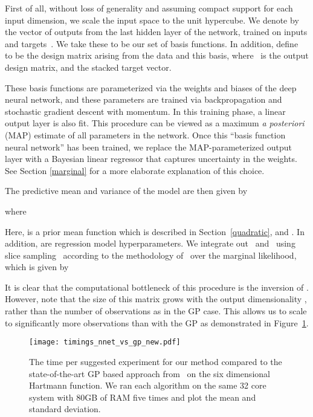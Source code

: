 \documentclass{article}
\begin{document}
First of all, without loss of generality and assuming compact support for each input dimension, we scale the input space to the unit hypercube. We denote by~ the vector of outputs from the last hidden layer of the network, trained on inputs and targets~. We take these to be our set of basis functions. In addition, define~ to be the design matrix arising from the data and this basis, where~ is the output design matrix, and  the stacked target vector.

These basis functions are parameterized via the weights and biases of the deep neural network, and these parameters are trained via backpropagation and stochastic gradient descent with momentum.  In this training phase, a linear output layer is also fit.  This procedure can be viewed as a maximum \emph{a posteriori} (MAP) estimate of all parameters in the network.  Once this ``basis function neural network'' has been trained, we replace the MAP-parameterized output layer with a Bayesian linear regressor that captures uncertainty in the weights.  See Section \ref{marginal} for a more elaborate explanation of this choice.

The predictive mean  and variance  of the model are then given by~\citep[see][]{bishop-2006}

where


Here,  is a prior mean function which is described in Section~\ref{quadratic}, and . In addition,  are regression model hyperparameters.  We integrate out~ and~ using slice sampling~\cite{Neal00slicesampling} according to the methodology of~\citet{snoek-etal-2012b} over the marginal likelihood, which is given by


It is clear that the computational bottleneck of this procedure is the inversion of . However, note that the size of this matrix grows with the output dimensionality , rather than the number of observations  as in the GP case.  This allows us to scale to significantly more observations than with the GP as demonstrated in Figure~\ref{fig:timings}.


\begin{figure}[t]
  \texttt{[image: timings\_nnet\_vs\_gp\_new.pdf]}\caption{The time per suggested experiment for our method compared to the state-of-the-art GP based approach from~\citet{snoek-etal-2014a} on the six dimensional Hartmann function.  We ran each algorithm on the same 32 core system with 80GB of RAM five times and plot the mean and standard deviation.}
\label{fig:timings}
\end{figure}
\end{document}
